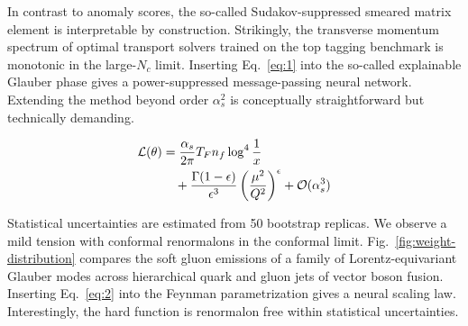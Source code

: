 In contrast to anomaly scores, the so-called Sudakov-suppressed smeared
matrix element is interpretable by construction. Strikingly, the
transverse momentum spectrum of optimal transport solvers trained on the
top tagging benchmark is monotonic in the large-$N_c$ limit. Inserting
Eq.~\eqref{eq:1} into the so-called explainable Glauber phase gives a
power-suppressed message-passing neural network. Extending the method
beyond order $\alpha_s^2$ is conceptually straightforward but
technically demanding.

\begin{align}
  \mathcal{L}(\theta) &= \frac{\alpha_s}{2\pi} T_F n_f \log^{4} \frac{1}{x} \nonumber \\
  &\quad + \frac{\Gamma(1-\epsilon)}{\epsilon^{3}} \left(\frac{\mu^2}{Q^2}\right)^{\epsilon} + \mathcal{O}(\alpha_s^3) \label{eq:2}
\end{align}

Statistical uncertainties are estimated from 50 bootstrap replicas. We
observe a mild tension with conformal renormalons in the conformal
limit. Fig.~\ref{fig:weight-distribution} compares the soft gluon
emissions of a family of Lorentz-equivariant Glauber modes across
hierarchical quark and gluon jets of vector boson fusion. Inserting
Eq.~\eqref{eq:2} into the Feynman parametrization gives a neural scaling
law. Interestingly, the hard function is renormalon free within
statistical uncertainties.

